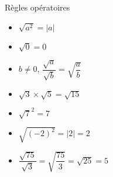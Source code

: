 \begin{pageCours}
\begin{ThT}{Règles opératoires}
\begin{minipage}{0.33\linewidth}
\begin{itemize}
\end{itemize}
\end{minipage}
\begin{minipage}{0.33\linewidth}
\begin{itemize}
\item $\sqrt{a ^2} = |a|$
\item $\sqrt{0} = 0$
 
\end{itemize}
\end{minipage}
\begin{minipage}{0.33\linewidth}
\begin{itemize}
\item $b \neq 0$, $\dfrac{\sqrt{a}}{\sqrt{b}} = \sqrt{  \dfrac{a}{b} } $ 
\end{itemize}
\end{minipage}

\end{ThT}
 

 
 
\begin{Ex}

\begin{minipage}{0.33\linewidth}
\begin{itemize}
\item $\sqrt 3  \times \sqrt 5 = \sqrt{15}$ 
\item $\sqrt 7^2 = 7$ 

\end{itemize}
\end{minipage}
\begin{minipage}{0.33\linewidth}
\begin{itemize}
\item $\sqrt{(-2)^2} = |2|=2$
\item $\dfrac{\sqrt{75}}{\sqrt{3}} = \sqrt{  \dfrac{75}{3} } = \sqrt{ 25 } = 5$ 
\end{itemize}
\end{minipage}

\end{Ex}
 
\end{pageCours} %


